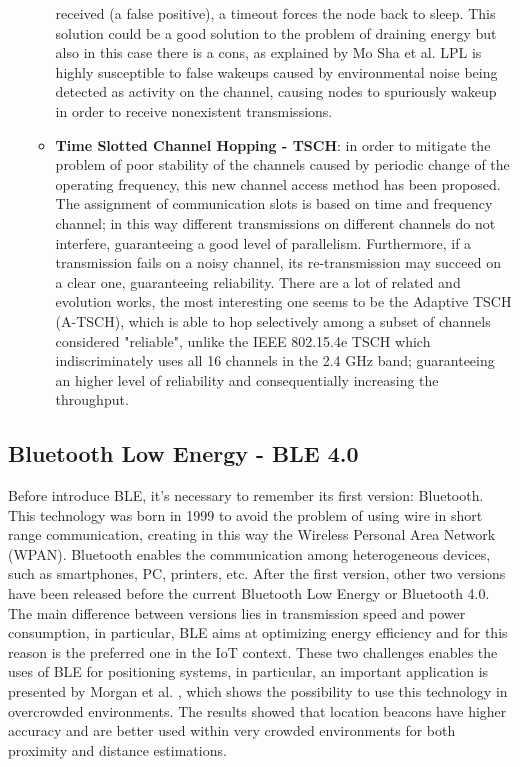 \documentclass[sigconf]{acmart}
\begin{document}
\begin{itemize}
\begin{itemize}
received (a false positive), a timeout forces the node back to sleep. This solution could be a good solution to the problem of draining energy but also in this case there is a cons, as explained by Mo Sha et al. \cite{sha_mo} LPL is highly susceptible to false wakeups caused by environmental noise being detected as activity on the channel, causing nodes to spuriously wakeup in order to receive nonexistent transmissions.
	\item \textbf{Time Slotted Channel Hopping - TSCH}: in order to mitigate the problem of poor stability of the channels caused by periodic change of the operating frequency, this new channel access method has been proposed. The assignment of communication slots is based on time and frequency channel; in this way different transmissions on different channels do not interfere, guaranteeing a good level of parallelism. Furthermore, if a transmission fails on a noisy channel, its re-transmission may succeed on a clear one, guaranteeing reliability. 
	There are a lot of related and evolution works, the most interesting one seems to be the Adaptive TSCH (A-TSCH)\cite{du}, which is able to hop selectively among a subset of channels considered "reliable", unlike the IEEE 802.15.4e TSCH which indiscriminately uses all 16 channels in the 2.4 GHz band; guaranteeing an higher level of reliability and consequentially increasing the throughput.
    \end{itemize}
    \end{itemize}
    
    
  	\subsection{Bluetooth Low Energy - BLE 4.0}
	Before introduce BLE, it's necessary to remember its first version: Bluetooth. This technology was born in 1999 to avoid the problem of using wire in short range communication, creating in this way the Wireless Personal Area Network (WPAN). Bluetooth enables the communication among heterogeneous devices, such as smartphones, PC, printers, etc. After the first version, other two versions have been released before the current Bluetooth Low Energy or Bluetooth 4.0.
	The main difference between versions lies in transmission speed and power consumption, in particular, BLE aims at optimizing energy efficiency and for this reason is the preferred one in the IoT context. These two challenges enables the uses of BLE for positioning systems, in particular, an important application is presented by Morgan et al. \cite{morgan}, which shows the possibility to use this technology in overcrowded environments. The results showed that location beacons have higher accuracy and are better used within very crowded environments for both proximity and distance estimations. 
\end{document}
